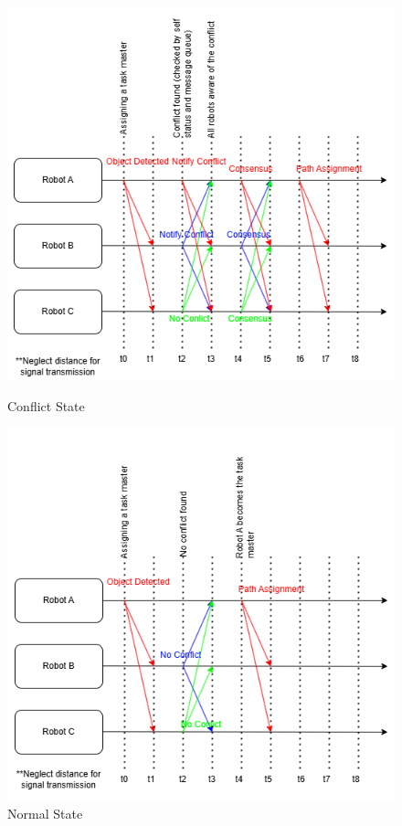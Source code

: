 \begin{figure}[!htb]
        \includegraphics[width=\linewidth]{assets/images/communication/outputs/consensus_conflict.png}
        \caption{Conflict State}\label{fig:GPS}
    \endminipage\hfill
        \includegraphics[width=\linewidth]{assets/images/communication/outputs/consensus_normal.png}
        \caption{Normal State}\label{fig:Emitter}
    \endminipage\hfill
\end{figure}
